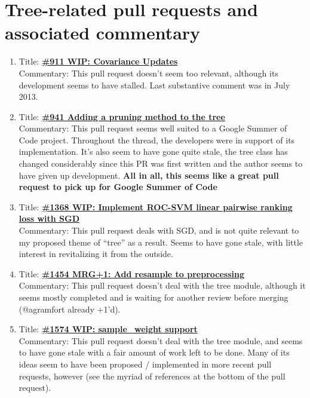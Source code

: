 \documentclass[12pt, oneside]{article}
\begin{document}
\section{Tree-related pull requests and associated commentary}
\begin{enumerate}
  \item 
  Title:
  \textbf{\href{https://github.com/scikit-learn/scikit-learn/pull/911}
    {\#911 WIP: Covariance Updates}}\\
  Commentary: This pull request doesn't seem too relevant, although
  its development seems to have stalled. Last substantive comment was
  in July 2013.
  
  \item 
  Title:
  \textbf{\href{https://github.com/scikit-learn/scikit-learn/pull/941}
    {\#941 Adding a pruning method to the tree}}\\
  Commentary: This pull request seems well suited to a Google Summer of Code
  project. Throughout the thread, the developers were in support of
  its implementation. It's also seem to have gone quite stale, the
  tree class has changed considerably since this PR was first written
  and the author seems to have given up development. \textbf{All in
    all, this seems like a great pull request to pick up for Google
    Summer of Code}

  \item 
  Title:
  \textbf{\href{https://github.com/scikit-learn/scikit-learn/pull/1386}
    {\#1368 WIP: Implement ROC-SVM linear pairwise ranking loss with SGD}}\\
  Commentary: This pull request deals with SGD, and is not quite
  relevant to my proposed theme of ``tree'' as a result. Seems to have
  gone stale, with little interest in revitalizing it from the
  outside.

  \item 
  Title:
  \textbf{\href{https://github.com/scikit-learn/scikit-learn/pull/1454}
    {\#1454 MRG+1: Add resample to preprocessing}}\\
  Commentary: This pull request doesn't deal with the tree module,
  although it seems mostly completed and is waiting for another review
  before merging (@agramfort already +1'd).

  \item 
  Title:
  \textbf{\href{https://github.com/scikit-learn/scikit-learn/pull/1574}
    {\#1574 WIP: sample\_weight support}}\\
  Commentary: This pull request doesn't deal with the tree module, and
  seems to have gone stale with a fair amount of work left to be
  done. Many of its ideas seem to have been proposed / implemented in
  more recent pull requests, however (see the myriad of references at
  the bottom of the pull request).


\end{enumerate}
\end{document}
